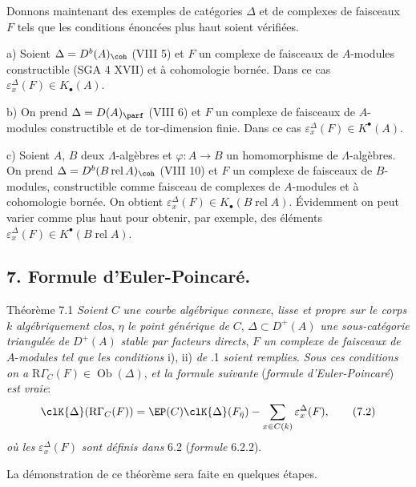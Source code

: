 Donnons maintenant des exemples de catégories $\Delta$ et de complexes de faisceaux $F$ tels que les conditions énoncées plus haut soient vérifiées.

a) Soient $\Delta=D^b(A)_{\coh}$ (VIII 5) et $F$ un complexe de faisceaux de $A$-modules constructible (SGA 4 XVII) et à cohomologie bornée. Dans ce cas $\varepsilon_x^\Delta(F)\in K_\bullet(A)$.

b) On prend $\Delta=D(A)_{\parf}$ (VIII 6) et $F$ un complexe de faisceaux de $A$-modules constructible et de tor-dimension finie. Dans ce cas $\varepsilon_x^\Delta(F)\in K^{\bullet}(A)$.

c) Soient $A$, $B$ deux $\Lambda$-algèbres et $\varphi:A\to B$ un homomorphisme de $\Lambda$-algèbres. On prend $\Delta=D^b(B\operatorname{ rel }A)_{\coh}$ (VIII 10) et $F$ un complexe de faisceaux de $B$-modules, constructible comme faisceau de complexes de $A$-modules et à cohomologie bornée. On obtient $\varepsilon_x^\Delta(F)\in K_\bullet(B\operatorname{ rel }A)$. Évidemment on peut varier comme plus haut pour obtenir, par exemple, des éléments $\varepsilon_x^\Delta(F)\in K^{\bullet}(B\operatorname{ rel }A)$.

\subsection*{7. Formule d'Euler-Poincaré.}

\begin{statement}{Théorème 7.1}
\emph{Soient} $C$ \emph{une courbe algébrique connexe}, \emph{lisse et propre sur le corps} $k$ \emph{algébriquement clos}, $\eta$ \emph{le point générique de} $C$, $\Delta\subset D^+(A)$ \emph{une sous-catégorie triangulée de} $D^+(A)$ \emph{stable par facteurs directs}, $F$ \emph{un complexe de faisceaux de} $A$-\emph{modules tel que les conditions} i), ii) \emph{de} .1 \emph{soient remplies}. \emph{Sous ces conditions on a} $\mathrm{R}\Gamma_C(F)\in\operatorname{Ob}(\Delta)$, \emph{et la formule suivante} (\emph{formule d'Euler-Poincaré}) \emph{est vraie}:
\[
\clK{\Delta}(\mathrm{R}\Gamma_C(F))
=
\EP(C)\clK{\Delta}(F_{\bar\eta})
-\sum_{x\in C(k)}\varepsilon_x^\Delta(F),
\tag{7.2}
\]
\emph{où les} $\varepsilon_x^\Delta(F)$ \emph{sont définis dans} 6.2 (\emph{formule} 6.2.2).
\end{statement}

La
démonstration de ce théorème sera faite en quelques étapes.

